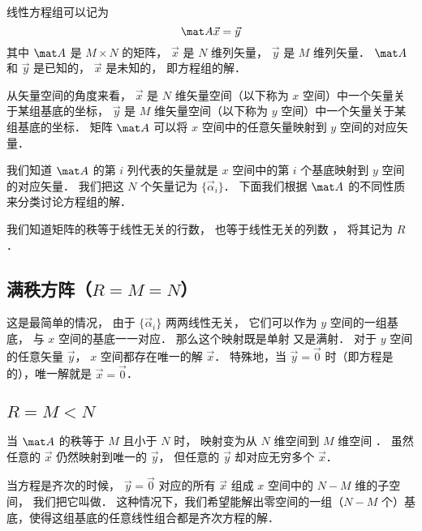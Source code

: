 


线性方程组可以记为
\begin{equation}\label{LinEq_eq1}
\mat A \vec x = \vec y
\end{equation}
其中 $\mat A$ 是 $M \times N$ 的矩阵， $\vec x$ 是 $N$ 维列矢量， $\vec y$ 是 $M$ 维列矢量． $\mat A$ 和 $\vec y$ 是已知的， $\vec x$ 是未知的， 即方程组的解．

从矢量空间的角度来看， $\vec x$ 是 $N$ 维矢量空间（以下称为 $x$ 空间）中一个矢量关于某组基底的坐标， $\vec y$ 是 $M$ 维矢量空间（以下称为 $y$ 空间）中一个矢量关于某组基底的坐标． 矩阵 $\mat A$ 可以将 $x$ 空间中的任意矢量映射到 $y$ 空间的对应矢量．

我们知道 $\mat A$ 的第 $i$ 列代表的矢量就是 $x$ 空间中的第 $i$ 个基底映射到 $y$ 空间的对应矢量． 我们把这 $N$ 个矢量记为 $\{\vec \alpha_i\}$． 下面我们根据 $\mat A$ 的不同性质来分类讨论方程组的解．

我们知道矩阵的秩等于线性无关的行数， 也等于线性无关的列数%
， 将其记为 $R$．

\subsection{满秩方阵（$R = M = N$）}
这是最简单的情况， 由于 $\{\vec \alpha_i\}$ 两两线性无关， 它们可以作为 $y$ 空间的一组基底， 与 $x$ 空间的基底一一对应． 那么这个映射既是单射%
又是满射．%
对于 $y$ 空间的任意矢量 $\vec y$， $x$ 空间都存在唯一的解 $\vec x$． 特殊地，当 $\vec y = \vec 0$ 时（即方程是的），唯一解就是 $\vec x = \vec 0$．

\subsection{$R = M < N$}

当 $\mat A$ 的秩等于 $M$ 且小于 $N$ 时， 映射变为从 $N$ 维空间到 $M$ 维空间 ． 虽然任意的 $\vec x$ 仍然映射到唯一的 $\vec y$， 但任意的 $\vec y$ 却对应无穷多个 $\vec x$． 


当方程是齐次的时候， $\vec y = \vec 0$ 对应的所有 $\vec x$ 组成 $x$ 空间中的 $N- M$ 维的子空间， 我们把它叫做． 这种情况下，我们希望能解出零空间的一组（$N - M$ 个）基底，使得这组基底的任意线性组合都是齐次方程的解．

